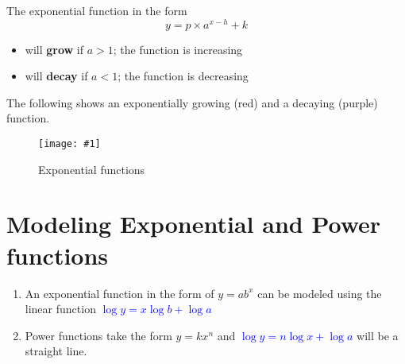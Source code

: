 \documentclass[11pt]{article}
\newcommand{\img}[3]{\begin{center}
  \begin{figure}[H]
    \centering
    \texttt{[image: \#1]}
    \caption{#3}
    \label{fig:fig1}
  \end{figure}
\end{center}}
\begin{document}
The exponential function in the form $$y = p\times a^{x - h} + k$$
\begin{itemize}
  \item will \textbf{grow} if $a > 1$; the function is increasing
  \item will \textbf{decay} if $a < 1$; the function is decreasing
\end{itemize}
The following shows an exponentially growing (red) and a decaying (purple) function.

\img{figs/exp.png}{0.6}{Exponential functions}

\pagebreak

\section{Modeling Exponential and Power functions}

\begin{enumerate}
  \item An exponential function in the form of $y = ab^x$ can be modeled using the linear function \textcolor{blue}{$\log y = x\log b + \log a$}
  \item Power functions take the form $y = kx^n$ and \textcolor{blue}{$\log y = n\log x + \log a$} will be a straight line.
\end{enumerate}
\end{document}
